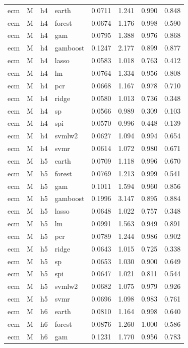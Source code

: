 \begin{ThreePartTable}
\begin{longtable}[t]{llclcccc}
\addlinespace
ecm & M & h4 & earth & 0.0711 & 1.241 & 0.990 & 0.848\\
ecm & M & h4 & forest & 0.0674 & 1.176 & 0.998 & 0.590\\
ecm & M & h4 & gam & 0.0795 & 1.388 & 0.976 & 0.868\\
ecm & M & h4 & gamboost & 0.1247 & 2.177 & 0.899 & 0.877\\
ecm & M & h4 & lasso & 0.0583 & 1.018 & 0.763 & 0.412\\
ecm & M & h4 & lm & 0.0764 & 1.334 & 0.956 & 0.808\\
ecm & M & h4 & pcr & 0.0668 & 1.167 & 0.978 & 0.710\\
ecm & M & h4 & ridge & 0.0580 & 1.013 & 0.736 & 0.348\\
ecm & M & h4 & sp & 0.0566 & 0.989 & 0.309 & 0.103\\
ecm & M & h4 & spi & 0.0570 & 0.996 & 0.448 & 0.139\\
ecm & M & h4 & svmlw2 & 0.0627 & 1.094 & 0.994 & 0.654\\
ecm & M & h4 & svmr & 0.0614 & 1.072 & 0.980 & 0.671\\
\addlinespace
ecm & M & h5 & earth & 0.0709 & 1.118 & 0.996 & 0.670\\
ecm & M & h5 & forest & 0.0769 & 1.213 & 0.999 & 0.541\\
ecm & M & h5 & gam & 0.1011 & 1.594 & 0.960 & 0.856\\
ecm & M & h5 & gamboost & 0.1996 & 3.147 & 0.895 & 0.884\\
ecm & M & h5 & lasso & 0.0648 & 1.022 & 0.757 & 0.348\\
ecm & M & h5 & lm & 0.0991 & 1.563 & 0.949 & 0.891\\
ecm & M & h5 & pcr & 0.0789 & 1.244 & 0.986 & 0.902\\
ecm & M & h5 & ridge & 0.0643 & 1.015 & 0.725 & 0.338\\
ecm & M & h5 & sp & 0.0653 & 1.030 & 0.900 & 0.649\\
ecm & M & h5 & spi & 0.0647 & 1.021 & 0.811 & 0.544\\
ecm & M & h5 & svmlw2 & 0.0682 & 1.075 & 0.979 & 0.926\\
ecm & M & h5 & svmr & 0.0696 & 1.098 & 0.983 & 0.761\\
\addlinespace
ecm & M & h6 & earth & 0.0810 & 1.164 & 0.998 & 0.640\\
ecm & M & h6 & forest & 0.0876 & 1.260 & 1.000 & 0.586\\
ecm & M & h6 & gam & 0.1231 & 1.770 & 0.956 & 0.783\\

\end{longtable}
\end{ThreePartTable}
